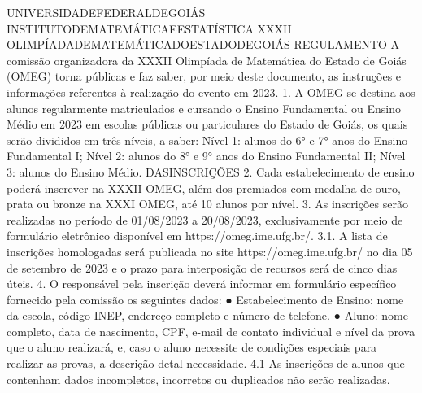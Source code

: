                                        UNIVERSIDADEFEDERALDEGOIÁS
                                  INSTITUTODEMATEMÁTICAEESTATÍSTICA
                          XXXII OLIMPÍADADEMATEMÁTICADOESTADODEGOIÁS
                                                   REGULAMENTO
               A comissão organizadora da XXXII Olimpíada de Matemática do Estado de Goiás
               (OMEG) torna públicas e faz saber, por meio deste documento, as instruções e
               informações referentes à realização do evento em 2023.
                 1.   A OMEG se destina aos alunos regularmente matriculados e cursando o
                      Ensino Fundamental ou Ensino Médio em 2023 em escolas públicas ou
                      particulares do Estado de Goiás, os quais serão divididos em três níveis, a
                      saber:
                      Nível 1: alunos do 6° e 7° anos do Ensino Fundamental I;
                      Nível 2: alunos do 8° e 9° anos do Ensino Fundamental II;
                      Nível 3: alunos do Ensino Médio.
                                                  DASINSCRIÇÕES
                 2.   Cada estabelecimento de ensino poderá inscrever na XXXII OMEG, além dos
                      premiados com medalha de ouro, prata ou bronze na XXXI OMEG, até 10
                      alunos por nível.
                 3.   As inscrições serão realizadas no período de 01/08/2023 a 20/08/2023,
                      exclusivamente      por   meio    de    formulário   eletrônico    disponível   em
                      https://omeg.ime.ufg.br/.
                      3.1.   A lista     de inscrições     homologadas será publicada no site
                      https://omeg.ime.ufg.br/ no dia 05 de setembro de 2023 e o prazo para
                      interposição de recursos será de cinco dias úteis.
                 4.   O responsável pela inscrição deverá informar em formulário específico
                      fornecido pela comissão os seguintes dados:
                          ● Estabelecimento de Ensino: nome da escola, código INEP, endereço
                             completo e número de telefone.
                          ● Aluno: nome completo, data de nascimento, CPF, e-mail de contato
                             individual e nível da prova que o aluno realizará, e, caso o aluno
                             necessite de condições especiais para realizar as provas, a descrição
                             detal necessidade.
                      4.1 As inscrições de alunos que contenham dados incompletos, incorretos ou
                      duplicados não serão realizadas.
